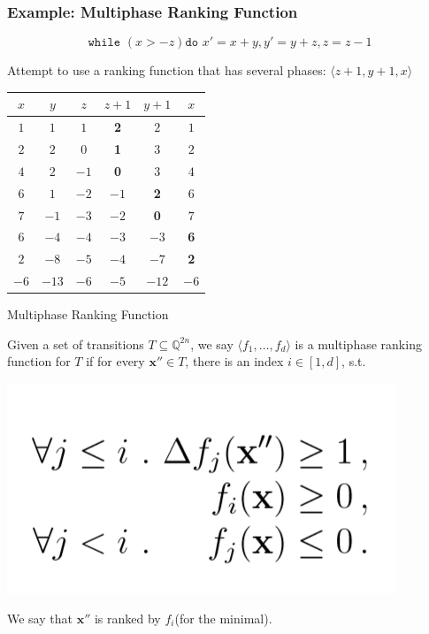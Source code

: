 \documentclass[11pt]{beamer}
\begin{document}
\begin{frame}\frametitle{Example: Multiphase Ranking Function}
\[\texttt{while }( x > -z) \texttt{do } x' = x + y, y' = y + z, z = z - 1\]

Attempt to use a ranking function that has several phases: 
$\langle z + 1, y + 1, x\rangle$
\begin{center}
\begin{tabular}{|c|c|c|c|c|c|}
\hline 
$x$&$y$&$z$&$z+1$&$y+1$&$x$\\
\hline
$1$&$1$&$1$&\textbf{2}&$2$&$1$\\
$2$&$2$&$0$&\textbf{1}&$3$&$2$\\
$4$&$2$&$-1$&\textbf{0}&$3$&$4$\\
\hline
$6$&$1$&$-2$&$-1$&\textbf{2}&$6$\\
$7$&$-1$&$-3$&$-2$&\textbf{0}&$7$\\
\hline
$6$&$-4$&$-4$&$-3$&$-3$&\textbf{6}\\
$2$&$-8$&$-5$&$-4$&$-7$&\textbf{2}\\
\hline
$-6$&$-13$&$-6$&$-5$&$-12$&$-6$\\
\hline
\end{tabular}
\end{center}
\end{frame}


\begin{frame}{Multiphase Ranking Function}
\begin{definition}
Given a set of transitions $T\subseteq \mathbb{Q}^{2n}$, we say $\langle f_1, \ldots, f_d\rangle$ is a multiphase ranking function for $T$ if for every $\textbf{x}'' \in T$, there is an index $i\in [1, d]$, s.t.

\begin{center}
\includegraphics[scale = 0.3]{3.PNG}
\end{center}
We say that $\textbf{x}''$ is ranked by $f_i$(for the minimal).
\end{definition}


\end{frame}
\end{document}
